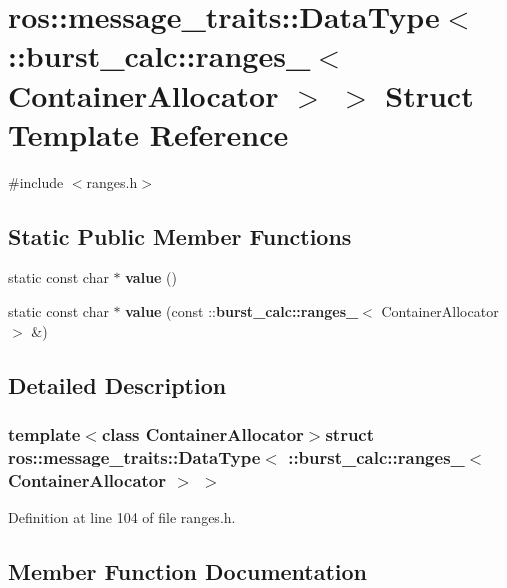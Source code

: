 \section{ros\-:\-:message\-\_\-traits\-:\-:\-Data\-Type$<$ \-:\-:burst\-\_\-calc\-:\-:ranges\-\_\-$<$ \-Container\-Allocator $>$ $>$ \-Struct \-Template \-Reference}
\label{structros_1_1message__traits_1_1DataType_3_01_1_1burst__calc_1_1ranges___3_01ContainerAllocator_01_4_01_4}


{\ttfamily \#include $<$ranges.\-h$>$}

\subsection*{\-Static \-Public \-Member \-Functions}
\begin{DoxyCompactItemize}
\item 
static const char $\ast$ {\bf value} ()
\item 
static const char $\ast$ {\bf value} (const \-::{\bf burst\-\_\-calc\-::ranges\-\_\-}$<$ \-Container\-Allocator $>$ \&)
\end{DoxyCompactItemize}


\subsection{\-Detailed \-Description}
\subsubsection*{template$<$class Container\-Allocator$>$struct ros\-::message\-\_\-traits\-::\-Data\-Type$<$ \-::burst\-\_\-calc\-::ranges\-\_\-$<$ Container\-Allocator $>$ $>$}



\-Definition at line 104 of file ranges.\-h.



\subsection{\-Member \-Function \-Documentation}
